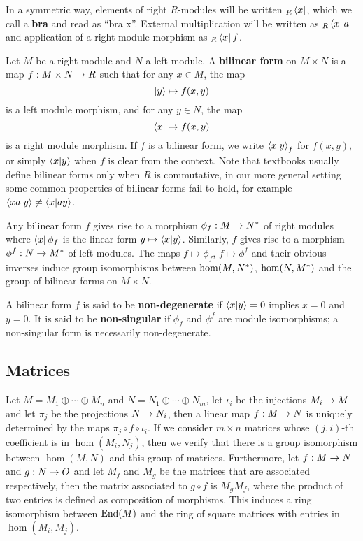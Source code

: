 In a symmetric way, elements of right $R$-modules will be written
${}_R\left\langle x \right\rvert$, which we call a \textbf{bra} and read as
``bra x''. External multiplication will be written as ${}_R\left\langle x \right\rvert a$
and application of a right module morphism as ${}_R\left\langle x \right\rvert f$.

Let $M$ be a right module and $N$ a left module. A
\textbf{bilinear form} on $M\times N$ is a map
$f:M\times N\rightarrow R$ such that for any $x\in M$, the map
\[\left\lvert y \right\rangle\mapsto f(x, y)\]
is a left module morphism, and for any $y\in N$, the map
\[\left\langle x \right\rvert\mapsto f(x, y)\]
is a right module morphism. If $f$ is a bilinear form, we write
$\left\langle x \middle| y \right\rangle_f$ for $f(x,y)$, or simply $\left\langle x \middle| y \right\rangle$
when $f$ is clear from the context. Note that textbooks usually define
bilinear forms only when $R$ is commutative, in our more general
setting some common properties of bilinear forms fail to hold,
for example $\left\langle xa \middle| y \right\rangle\ne\left\langle x \middle| ay \right\rangle$.

Any bilinear form $f$ gives rise to a morphism $ \phi_f : M \rightarrow
N^\ast$ of right modules where $\left\langle x \right\rvert\phi_f$ is the linear form $y
\mapsto \left\langle x \middle| y \right\rangle$. Similarly, $f$ gives rise to a morphism
$\phi^f:N\rightarrow M^\ast$ of left modules. The maps $f\mapsto\phi_f$,
$f\mapsto\phi^f$ and their obvious inverses induce group isomorphisms
between $\hom(M,N^\ast)$, $\hom(N,M^\ast)$ and the group of
bilinear forms on $M\times N$.

A bilinear form $f$ is said to be
\textbf{non-degenerate} if
$\left\langle x \middle| y \right\rangle=0$ implies $x=0$ and $y=0$. It is said to
be \textbf{non-singular} if $\phi_f$ and
$\phi^f$ are module isomorphisms; a non-singular form is necessarily
non-degenerate.


\subsection{Matrices}
\label{sec:linear-algebra:matrices}
Let $M=M_1\oplus\cdots\oplus M_n$ and $N=N_1\oplus\cdots\oplus N_m$,
let $\iota_i$ be the injections $M_i\rightarrow M$ and let $\pi_j$ be the
projections $N\rightarrow N_i$, then a linear map $f:M\rightarrow N$ is uniquely
determined by the maps $\pi_j\circ f\circ\iota_i$. If we consider
$m\times n$ matrices whose $(j,i)$-th coefficient is in
$\hom(M_i,N_j)$, then we verify that there is a group isomorphism
between $\hom(M,N)$ and this group of matrices. Furthermore, let
$f:M\rightarrow N$ and $g:N\rightarrow O$ and let $M_f$ and $M_g$ be the matrices that
are associated respectively, then the matrix associated to $g\circ f$
is $M_gM_f$, where the product of two entries is defined as
composition of morphisms. This induces a ring isomorphism between
$\operatorname{End}(M)$ and the ring of square matrices with entries in
$\hom(M_i,M_j)$.

